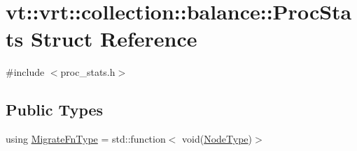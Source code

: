 \hypertarget{structvt_1_1vrt_1_1collection_1_1balance_1_1_proc_stats}{}\section{vt\+:\+:vrt\+:\+:collection\+:\+:balance\+:\+:Proc\+Stats Struct Reference}
\label{structvt_1_1vrt_1_1collection_1_1balance_1_1_proc_stats}


{\ttfamily \#include $<$proc\+\_\+stats.\+h$>$}

\subsection*{Public Types}
\begin{DoxyCompactItemize}
\item 
using \hyperlink{structvt_1_1vrt_1_1collection_1_1balance_1_1_proc_stats_a7cb065ac4de218cb717bc2634782f0cb}{Migrate\+Fn\+Type} = std\+::function$<$ void(\hyperlink{namespacevt_a866da9d0efc19c0a1ce79e9e492f47e2}{Node\+Type})$>$
\end{DoxyCompactItemize}

